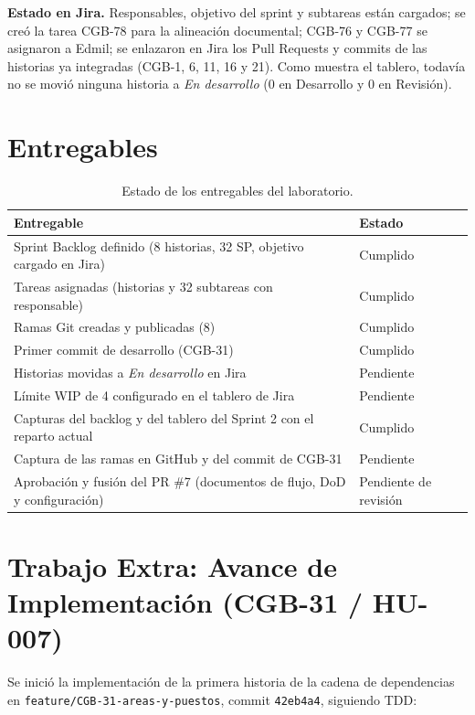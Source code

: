 \documentclass[11pt,a4paper]{article}
\begin{document}
\textbf{Estado en Jira.} Responsables, objetivo del sprint y subtareas están cargados; se creó la tarea CGB-78 para la alineación documental; CGB-76 y CGB-77 se asignaron a Edmil; se enlazaron en Jira los Pull Requests y commits de las historias ya integradas (CGB-1, 6, 11, 16 y 21). Como muestra el tablero, todavía no se movió ninguna historia a \textit{En desarrollo} (0 en Desarrollo y 0 en Revisión).

\section{Entregables}

\begin{table}[H]
\centering
\small
\begin{tabularx}{\textwidth}{X l}
\toprule
\textbf{Entregable} & \textbf{Estado} \\
\midrule
Sprint Backlog definido (8 historias, 32 SP, objetivo cargado en Jira) & Cumplido \\
Tareas asignadas (historias y 32 subtareas con responsable) & Cumplido \\
Ramas Git creadas y publicadas (8) & Cumplido \\
Primer commit de desarrollo (CGB-31) & Cumplido \\
Historias movidas a \textit{En desarrollo} en Jira & Pendiente \\
Límite WIP de 4 configurado en el tablero de Jira & Pendiente \\
Capturas del backlog y del tablero del Sprint 2 con el reparto actual & Cumplido \\
Captura de las ramas en GitHub y del commit de CGB-31 & Pendiente \\
Aprobación y fusión del PR \#7 (documentos de flujo, DoD y configuración) & Pendiente de revisión \\
\bottomrule
\end{tabularx}
\caption{Estado de los entregables del laboratorio.}
\end{table}

\section{Trabajo Extra: Avance de Implementación (CGB-31 / HU-007)}

Se inició la implementación de la primera historia de la cadena de dependencias en \texttt{feature/CGB-31-areas-y-puestos}, commit \texttt{42eb4a4}, siguiendo TDD:
\end{document}

